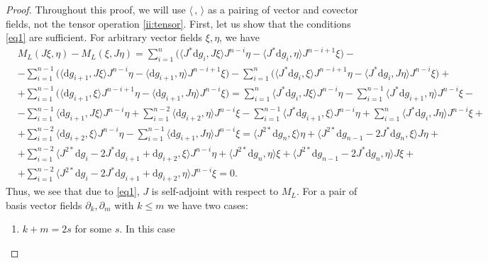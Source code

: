 \documentclass[10pt,a4paper]{amsart}
\newcommand{\ddd}{\mathrm{d}}
\begin{document}
\begin{proof}
Throughout this proof, we will use $\langle \, , \,\rangle$ as a pairing of vector and covector fields, not the tensor operation \eqref{ii:tensor}. First, let us show that the conditions \eqref{eq1} are sufficient. For arbitrary vector fields $\xi, \eta$, we have
$$
\begin{aligned}
& M_L(J\xi, \eta) - M_L(\xi, J\eta) = \sum_{i = 1}^n \Big( \langle J^* \ddd g_i, J \xi \rangle J^{n - i} \eta  - \langle J^* \ddd g_i, \eta \rangle J^{n - i + 1} \xi\Big) - \\
& - \sum_{i = 1}^{n - 1} \Big( \langle \ddd g_{i + 1}, J \xi \rangle J^{n - i} \eta  - \langle \ddd g_{i + 1}, \eta \rangle J^{n - i + 1} \xi\Big) - \sum_{i = 1}^n \Big( \langle J^* \ddd g_i, \xi \rangle J^{n - i + 1} \eta  - \langle J^* \ddd g_i, J \eta \rangle J^{n - i} \xi\Big) + \\
& + \sum_{i = 1}^{n - 1} \Big( \langle \ddd g_{i + 1}, \xi \rangle J^{n - i + 1} \eta  - \langle \ddd g_{i + 1}, J \eta \rangle J^{n - i} \xi\Big) = \sum_{i = 1}^n \langle J^* \ddd g_i, J \xi \rangle J^{n - i} \eta - \sum_{i = 1}^{n - 1} \langle J^* \ddd g_{i + 1}, \eta \rangle J^{n - i} \xi - \\
& - \sum_{i = 1}^{n - 1} \langle \ddd g_{i + 1}, J \xi \rangle J^{n - i} \eta + \sum_{i = 1}^{n - 2} \langle \ddd g_{i + 2}, \eta \rangle J^{n - i} \xi - \sum_{i = 1}^{n - 1} \langle J^* \ddd g_{i + 1}, \xi \rangle J^{n - i} \eta  + \sum_{i = 1}^{n}\langle J^* \ddd g_i, J \eta \rangle J^{n - i} \xi + \\
& + \sum_{i = 1}^{n - 2} \langle \ddd g_{i + 2}, \xi \rangle J^{n - i} \eta  -\sum_{i = 1}^{n - 1} \langle \ddd g_{i + 1}, J \eta \rangle J^{n - i} \xi = \langle J^{2*} \ddd g_n, \xi \rangle \eta + \langle J^{2*} \ddd g_{n - 1} - 2 J^* \ddd g_n , \xi \rangle J \eta + \\
& + \sum_{i = 1}^{n - 2}\langle J^{2*} \ddd g_i - 2 J^* \ddd g_{i + 1} + \ddd g_{i + 2}, \xi \rangle J^{n - i}\eta + \langle J^{2*} \ddd g_n, \eta \rangle \xi + \langle J^{2*} \ddd g_{n - 1} - 2 J^* \ddd g_n , \eta \rangle J \xi + \\
& + \sum_{i = 1}^{n - 2}\langle J^{2*} \ddd g_i - 2 J^* \ddd g_{i + 1} + \ddd g_{i + 2}, \eta \rangle J^{n - i}\xi = 0.
\end{aligned} 
$$
Thus, we see that due to \eqref{eq1}, $J$ is self-adjoint with respect to $M_L$. For a pair of basis vector fields $\partial_k, \partial_m$ with $k \leq m$ we have two cases:
\begin{enumerate}
    \item $k + m = 2s$ for some $s$. In this case

\end{enumerate}
\end{proof}
\end{document}
